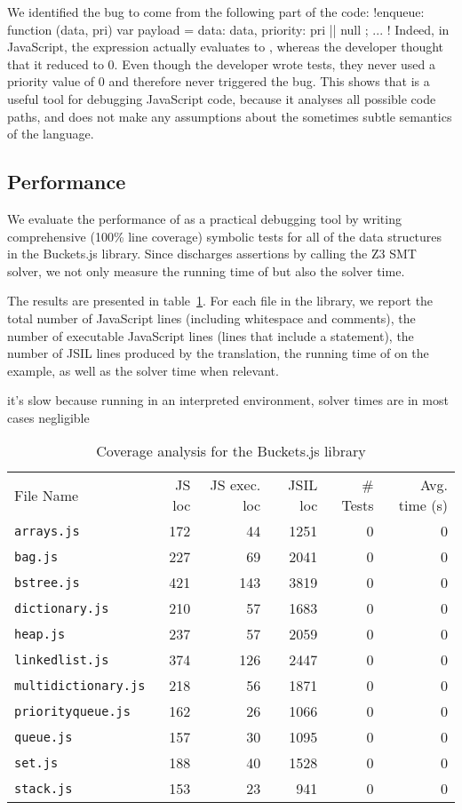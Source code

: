 We identified the bug to come from the following part of the code: \jsinline!enqueue: function (data, pri) {var payload = { data: data, priority: pri || null }; ... }!
Indeed, in JavaScript, the expression  actually evaluates to , whereas the developer thought that it reduced to 0.
Even though the developer wrote tests, they never used a priority value of 0 and therefore never triggered the bug.
This shows that \cosette is a useful tool for debugging JavaScript code, because it analyses all possible code paths, and does not make any assumptions about the sometimes subtle semantics of the language.

\subsection{Performance}

We evaluate the performance of \cosette as a practical debugging tool by writing comprehensive (100\% line coverage) symbolic tests for all of the data structures in the Buckets.js library.
Since \cosette discharges assertions by calling the Z3 SMT solver, we not only measure the running time of \cosette but also the solver time.

The results are presented in table~\ref{cosette:res}.
For each file in the library, we report the total number of JavaScript lines (including whitespace and comments), the number of executable JavaScript lines (lines that include a statement), the number of JSIL lines produced by the translation, the running time of \cosette on the example, as well as the solver time when relevant.

it's slow because running in an interpreted environment, solver times are in most cases negligible

\begin{table}[h]
{
\small
\begin{tabular}{lrrrrr}
\toprule
File Name & JS loc & JS exec. loc & JSIL loc & \# Tests & Avg. time (s)\\
\cmidrule{1-5}
\texttt{arrays.js} & 172 & 44 & 1251 & 0 & 0 \\
\texttt{bag.js} & 227 & 69 & 2041 & 0 & 0\\
\texttt{bstree.js} & 421 & 143 & 3819 & 0 & 0\\
\texttt{dictionary.js} & 210 & 57 & 1683 & 0 & 0\\
\texttt{heap.js} & 237 & 57 & 2059 & 0 & 0\\
\texttt{linkedlist.js} & 374 & 126 & 2447 & 0 & 0\\
\texttt{multidictionary.js} & 218 & 56 & 1871 & 0 & 0\\
\texttt{priorityqueue.js} & 162 & 26 & 1066 & 0 & 0\\
\texttt{queue.js} & 157 & 30 & 1095 & 0 & 0\\
\texttt{set.js} & 188 & 40 & 1528 & 0 & 0\\
\texttt{stack.js} & 153 & 23 & 941 & 0 & 0\\
\bottomrule
\end{tabular}
}
\caption{Coverage analysis for the Buckets.js library}
\label{cosette:res}
\end{table}
